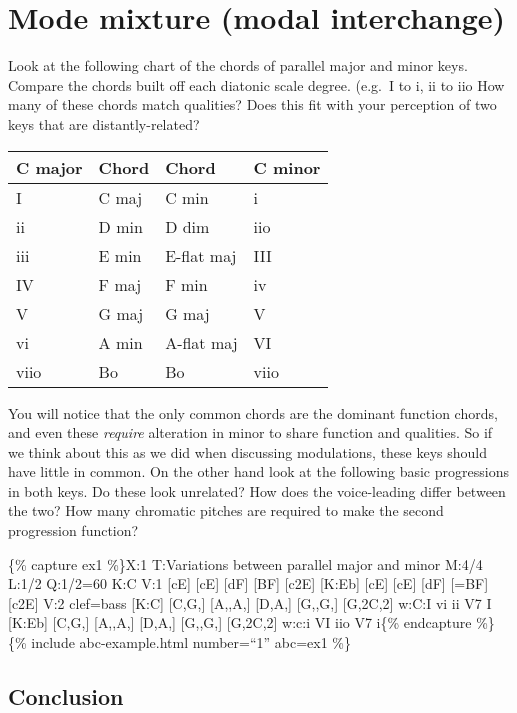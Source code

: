 \documentclass{book}
\begin{document}
\hypertarget{mode-mixture-modal-interchange}{%
\section{Mode mixture (modal
interchange)}\label{mode-mixture-modal-interchange}}

Look at the following chart of the chords of parallel major and minor keys.
Compare the chords built off each diatonic scale degree. (e.g.~I to i, ii to
iio How many of these chords match qualities? Does this fit with your
perception of two keys that are distantly-related?

\begin{longtable}[]{@{}llll@{}}
\toprule
C major & Chord & Chord & C minor \\
\midrule
\endhead
I & C maj & C min & i \\
ii & D min & D dim & iio \\
iii & E min & E-flat maj & III \\
IV & F maj & F min & iv \\
V & G maj & G maj & V \\
vi & A min & A-flat maj & VI \\
viio & Bo & Bo & viio \\
\bottomrule
\end{longtable}

You will notice that the only common chords are the dominant function chords,
and even these \emph{require} alteration in minor to share function and
qualities. So if we think about this as we did when discussing modulations,
these keys should have little in common. On the other hand look at the
following basic progressions in both keys. Do these look unrelated? How does
the voice-leading differ between the two? How many chromatic pitches are
required to make the second progression function?

\{\% capture ex1 \%\}X:1 T:Variations between parallel major and minor M:4/4
L:1/2 Q:1/2=60 K:C V:1 {[}cE{]} {[}cE{]}\textbar{} {[}dF{]} {[}BF{]}\textbar{}
{[}c2E{]}\textbar{]} {[}K:Eb{]} {[}cE{]} {[}cE{]}\textbar{} {[}dF{]}
{[}=BF{]}\textbar{} {[}c2E{]}\textbar{]} V:2 clef=bass {[}K:C{]} {[}C,G,{]}
{[}A,,A,{]}\textbar{} {[}D,A,{]} {[}G,,G,{]}\textbar{} {[}G,2C,2{]}\textbar{]}
w:C:I vi ii V7 I {[}K:Eb{]} {[}C,G,{]} {[}A,,A,{]}\textbar{} {[}D,A,{]}
{[}G,,G,{]}\textbar{} {[}G,2C,2{]}\textbar{]} w:c:i VI iio V7 i\{\% endcapture
\%\} \{\% include abc-example.html number=``1'' abc=ex1 \%\}

\hypertarget{conclusion-1}{%
\subsection{Conclusion}\label{conclusion-1}}
\end{document}
